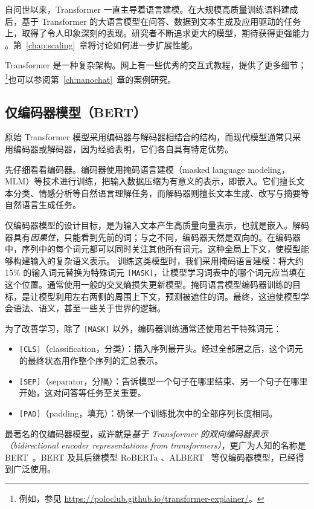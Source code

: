 自问世以来，Transformer 一直主导着语言建模。在大规模高质量训练语料建成后，基于 Transformer 的大语言模型在问答、数据到文本生成及应用驱动的任务上，取得了令人印象深刻的表现。研究者不断追求更大的模型，期待获得更强能力 \citep{brown2020language}。第~\ref{chap:scaling}~章将讨论如何进一步扩展性能。

Transformer 是一种复杂架构。网上有一些优秀的交互式教程，提供了更多细节；\footnote{例如，参见 \url{https://poloclub.github.io/transformer-explainer/}。}也可以参阅第~\ref{ch:nanochat}~章的案例研究。

\subsection{仅编码器模型（BERT）}
原始 Transformer 模型采用编码器与解码器相结合的结构，而现代模型通常只采用编码器或解码器，因为经验表明，它们各自具有特定优势。

先仔细看看编码器。编码器使用掩码语言建模（masked language modeling，MLM）等技术进行训练，把输入数据压缩为有意义的表示，即嵌入。它们擅长文本分类、情感分析等自然语言理解任务，而解码器则擅长文本生成、改写与摘要等自然语言生成任务。

仅编码器模型的设计目标，是为输入文本产生高质量向量表示，也就是嵌入。解码器具有{\em 因果性}，只能看到先前的词；与之不同，编码器天然是双向的。在编码器中，序列中的每个词元都可以同时关注其他所有词元。这种全局上下文，使模型能够构建输入的复杂语义表示。
训练这类模型时，我们采用掩码语言建模：将大约 15\% 的输入词元替换为特殊词元 \texttt{[MASK]}，让模型学习词表中的哪个词元应当填在这个位置。通常使用一般的交叉熵损失更新模型。掩码语言模型编码器训练的目标，是让模型利用左右两侧的周围上下文，预测被遮住的词。最终，这迫使模型学会语法、语义，甚至一些关于世界的逻辑。

为了改善学习，除了 \texttt{[MASK]} 以外，编码器训练通常还使用若干特殊词元：
\begin{itemize}
    \item \texttt{[CLS]}（classification，分类）：插入序列最开头。经过全部层之后，这个词元的最终状态用作整个序列的汇总表示。
    \item \texttt{[SEP]}（separator，分隔）：告诉模型一个句子在哪里结束、另一个句子在哪里开始，这对问答等任务至关重要。
    \item \texttt{[PAD]}（padding，填充）：确保一个训练批次中的全部序列长度相同。
\end{itemize}
最著名的仅编码器模型，或许就是{\em 基于 Transformer 的双向编码器表示（bidirectional encoder representations from transformers）}，更广为人知的名称是 BERT~\citep{devlin2018bert}。BERT 及其后继模型 RoBERTa \citep{liu2019roberta}、ALBERT~\citep{lan2019albert} 等仅编码器模型，已经得到广泛使用。

